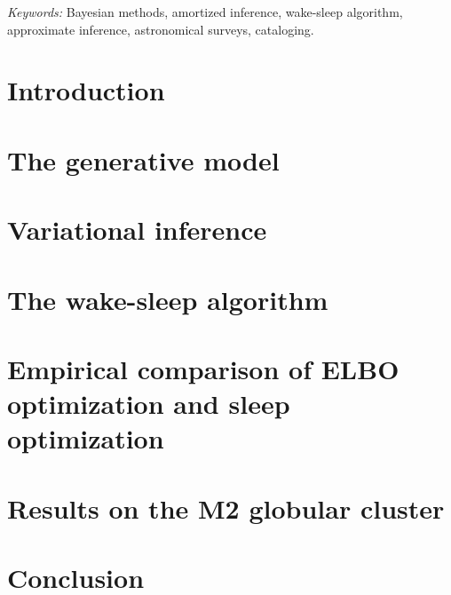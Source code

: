 \documentclass[12pt]{article}
\begin{document}
\noindent%
{\it Keywords:}  Bayesian methods, amortized inference, wake-sleep algorithm, approximate inference, astronomical surveys, cataloging. 
\vfill

\newpage
{} %
\section{Introduction}
\label{sec:intro}


\section{The generative model}
\label{sec:gen_model}


\section{Variational inference}
\label{sec:var_inference}


\section{The wake-sleep algorithm}
\label{sec:wake_sleep}



% 

\section{Empirical comparison of ELBO optimization and sleep optimization}

% 

\section{Results on the M2 globular cluster}


\section{Conclusion}
\label{sec:discussion}




\end{document}
